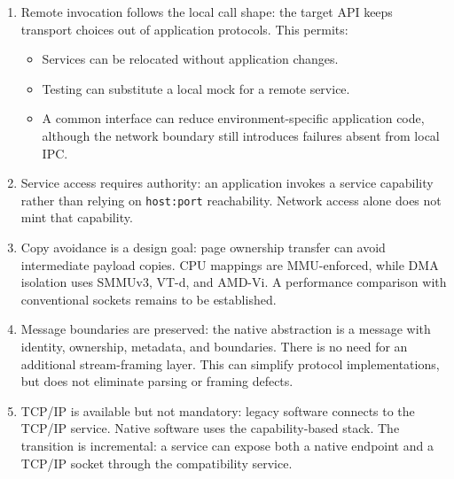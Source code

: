 \begin{enumerate}
    \item Remote invocation follows the local call shape: the target API keeps
        transport choices out of application protocols. This permits:
        \begin{itemize}
            \item Services can be relocated without application changes.
            \item Testing can substitute a local mock for a remote service.
            \item A common interface can reduce environment-specific application
                code, although the network boundary still introduces failures
                absent from local IPC.
        \end{itemize}

    \item Service access requires authority: an application invokes a service
        capability rather than relying on \texttt{host:port} reachability. Network
        access alone does not mint that capability.

    \item Copy avoidance is a design goal: page ownership transfer can avoid
        intermediate payload copies. CPU mappings are MMU-enforced, while DMA
        isolation uses SMMUv3, VT-d, and AMD-Vi. A performance comparison with
        conventional sockets remains to be established.

    \item Message boundaries are preserved: the native abstraction is a
        message with identity, ownership, metadata, and boundaries. There is no
        need for an additional stream-framing layer. This can simplify protocol
        implementations, but does not eliminate parsing or framing defects.

    \item TCP/IP is available but not mandatory: legacy software
        connects to the TCP/IP service. Native software uses the capability-based
        stack. The transition is incremental: a service can expose both a native
        endpoint and a TCP/IP socket through the compatibility service.
\end{enumerate}

\endinput

